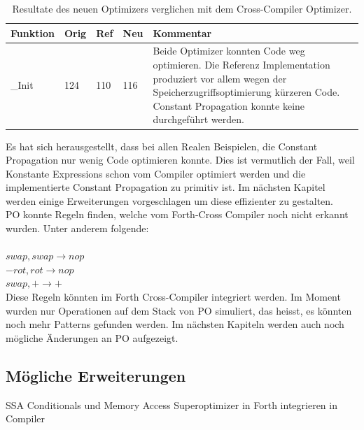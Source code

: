 \begin{table}[H]
\begin{center}
    \begin{tabular}{ | l | l | l | l | p{8cm} |}
    \hline
    \textbf{Funktion} & \textbf{Orig} & \textbf{Ref} & \textbf{Neu} & \textbf{Kommentar} \\ \hline
    \_Init & 124 & 110 & 116 & Beide Optimizer konnten Code weg optimieren. Die Referenz Implementation produziert vor allem wegen der Speicherzugriffsoptimierung kürzeren Code. Constant Propagation konnte keine durchgeführt werden.  \\ 
    \hline
		
    \end{tabular}
		\caption{Resultate des neuen Optimizers verglichen mit dem Cross-Compiler Optimizer.}
		\label{tab:peepresults}
\end{center}
\end{table}

Es hat sich herausgestellt, dass bei allen Realen Beispielen, die Constant Propagation nur wenig Code optimieren konnte. Dies ist vermutlich der Fall, weil Konstante Expressions schon vom Compiler optimiert werden und die implementierte Constant Propagation zu primitiv ist. Im nächsten Kapitel werden einige Erweiterungen vorgeschlagen um diese effizienter zu gestalten. \\ PO konnte Regeln finden, welche vom Forth-Cross Compiler noch nicht erkannt wurden. Unter anderem folgende:\\ \\
%
$swap, swap \rightarrow nop$\\
$-rot, rot \rightarrow nop$\\
$swap, + \rightarrow +$\\
%

Diese Regeln könnten im Forth Cross-Compiler integriert werden. Im Moment wurden nur Operationen auf dem Stack von PO simuliert, das heisst, es könnten noch mehr Patterns gefunden werden. Im nächsten Kapiteln werden auch noch mögliche Änderungen an PO aufgezeigt.

\subsection{Mögliche Erweiterungen}
SSA
Conditionals und Memory Access
Superoptimizer
in Forth
integrieren in Compiler